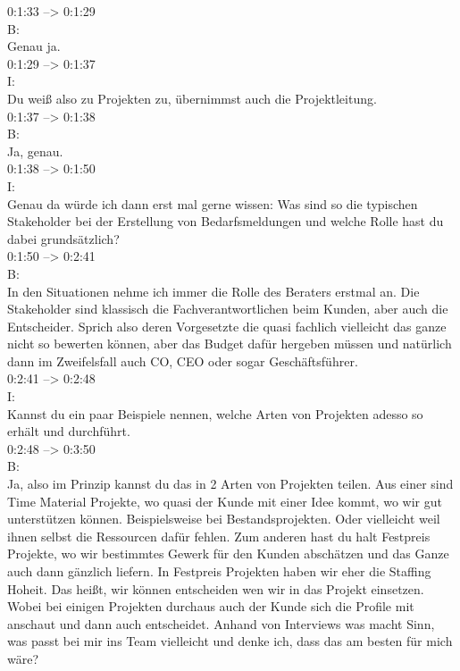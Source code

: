 0:1:33 --> 0:1:29\\
B:\\
Genau ja.\\

0:1:29 --> 0:1:37\\
I:\\
Du weiß also zu Projekten zu, übernimmst auch die Projektleitung.\\

0:1:37 --> 0:1:38\\
B:\\
Ja, genau.\\

0:1:38 --> 0:1:50\\
I:\\
Genau da würde ich dann erst mal gerne wissen: Was sind so die typischen Stakeholder bei der Erstellung von Bedarfsmeldungen und welche Rolle hast du dabei grundsätzlich?\\

0:1:50 --> 0:2:41\\
B:\\
In den Situationen nehme ich immer die Rolle des Beraters erstmal an. Die Stakeholder sind klassisch die Fachverantwortlichen beim Kunden, aber auch die Entscheider. Sprich also deren Vorgesetzte die quasi fachlich vielleicht das ganze nicht so bewerten können, aber das Budget dafür hergeben müssen und natürlich dann im Zweifelsfall auch CO, CEO oder sogar Geschäftsführer.\\

0:2:41 --> 0:2:48\\
I:\\
Kannst du ein paar Beispiele nennen, welche Arten von Projekten adesso so erhält und durchführt.\\

0:2:48 --> 0:3:50\\
B:\\
Ja, also im Prinzip kannst du das in 2 Arten von Projekten teilen. Aus einer sind Time Material Projekte, wo quasi der Kunde mit einer Idee kommt, wo wir gut unterstützen können. Beispielsweise bei Bestandsprojekten. Oder vielleicht weil ihnen selbst die Ressourcen dafür fehlen. Zum anderen hast du halt Festpreis Projekte, wo wir bestimmtes Gewerk für den Kunden abschätzen und das Ganze auch dann gänzlich liefern. In Festpreis Projekten haben wir eher die Staffing Hoheit. Das heißt, wir können entscheiden wen wir in das Projekt einsetzen. Wobei bei einigen Projekten durchaus auch der Kunde sich die Profile mit anschaut und dann auch entscheidet. Anhand von Interviews was macht Sinn, was passt bei mir ins Team vielleicht und denke ich, dass das am besten für mich wäre?\\

